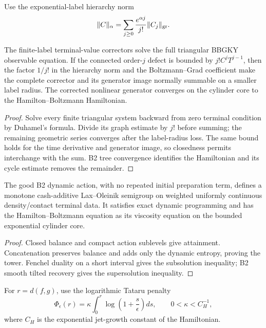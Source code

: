 Use the exponential-label hierarchy norm
\[
 \|C\|_\alpha=\sum_{j\ge0}\frac{e^{\alpha j}}{j!}\|C_j\|_{\rm gr}.
\]

\begin{theorem}
\label{thm:r11-b4-corrector}
The finite-label terminal-value correctors solve the full triangular BBGKY
observable equation.  If the connected order-$j$ defect is bounded by
$j!C^jT^{j-1}$, then the factor $1/j!$ in the hierarchy norm and the
Boltzmann--Grad coefficient make the complete corrector and its generator
image normally summable on a smaller label radius.  The corrected nonlinear
generator converges on the cylinder core to the Hamilton--Boltzmann
Hamiltonian.
\end{theorem}

\begin{proof}
Solve every finite triangular system backward from zero terminal condition by
Duhamel's formula.  Divide its graph estimate by $j!$ before summing; the
remaining geometric series converges after the label-radius loss.  The same
bound holds for the time derivative and generator image, so closedness permits
interchange with the sum.  B2 tree convergence identifies the Hamiltonian and
its cycle estimate removes the remainder.
\end{proof}

\begin{theorem}
\label{thm:r11-b4-action}
The good B2 dynamic action, with no repeated initial preparation term, defines
a monotone cash-additive Lax--Oleinik semigroup on weighted uniformly
continuous density/contact terminal data.  It satisfies exact dynamic
programming and has the Hamilton--Boltzmann equation as its viscosity equation
on the bounded exponential cylinder core.
\end{theorem}

\begin{proof}
Closed balance and compact action sublevels give attainment.  Concatenation
preserves balance and adds only the dynamic entropy, proving the tower.
Fenchel duality on a short interval gives the subsolution inequality; B2
smooth tilted recovery gives the supersolution inequality.
\end{proof}

For $r=d(f,g)$, use the logarithmic Tataru penalty
\[
 \Phi_\epsilon(r)=
 \kappa\int_0^r\log\left(1+\frac{s}{\epsilon}\right)ds,
 \qquad 0<\kappa<C_H^{-1},
\]
where $C_H$ is the exponential jet-growth constant of the Hamiltonian.

